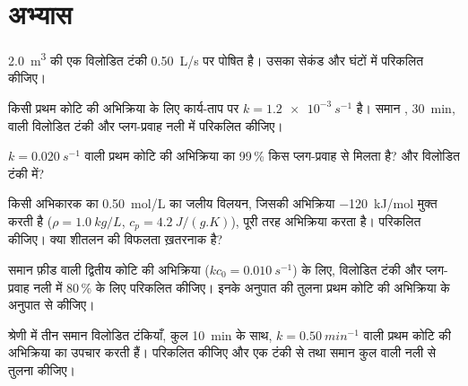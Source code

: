 \section{अभ्यास}

\begin{exercise}[$\star$]\label{exo:b2:continuous-reactors:1}
\qty{2.0}{m^3} की एक विलोडित टंकी \qty{0.50}{L/s} पर पोषित है। उसका
 सेकंड और घंटों में परिकलित कीजिए।
\end{exercise}

\begin{exercise}[$\star$]\label{exo:b2:continuous-reactors:2}
किसी प्रथम कोटि की अभिक्रिया के लिए कार्य-ताप पर $k = \qty{1.2e-3}{s^{-1}}$ है।
समान , \qty{30}{min}, वाली विलोडित टंकी और प्लग-प्रवाह नली में
 परिकलित कीजिए।
\end{exercise}

\begin{exercise}[$\star$]\label{exo:b2:continuous-reactors:3}
$k = \qty{0.020}{s^{-1}}$ वाली प्रथम कोटि की अभिक्रिया का 99\,\% 
किस प्लग-प्रवाह  से मिलता है? और विलोडित टंकी में?
\end{exercise}

\begin{exercise}[$\star$]\label{exo:b2:continuous-reactors:4}
किसी अभिकारक का \qty{0.50}{mol/L} का जलीय विलयन, जिसकी अभिक्रिया
\qty{-120}{kJ/mol} मुक्त करती है ($\rho = \qty{1.0}{kg/L}$, $c_p =
\qty{4.2}{J/(g.K)}$), पूरी तरह अभिक्रिया करता है। 
परिकलित कीजिए। क्या शीतलन की विफलता ख़तरनाक है?
\end{exercise}

\begin{exercise}[$\star\star$]\label{exo:b2:continuous-reactors:5}
समान फ़ीड वाली द्वितीय कोटि की अभिक्रिया ($kc_0 = \qty{0.010}{s^{-1}}$) के लिए,
विलोडित टंकी और प्लग-प्रवाह नली में 80\,\%  के लिए 
परिकलित कीजिए। इनके अनुपात की तुलना प्रथम कोटि की अभिक्रिया के अनुपात से कीजिए।
\end{exercise}

\begin{exercise}[$\star\star$]\label{exo:b2:continuous-reactors:6}
श्रेणी में तीन समान विलोडित टंकियाँ, कुल  \qty{10}{min} के साथ,
$k = \qty{0.50}{min^{-1}}$ वाली प्रथम कोटि की अभिक्रिया का उपचार करती हैं।
 परिकलित कीजिए और एक टंकी से तथा समान कुल  वाली नली से
तुलना कीजिए।
\end{exercise}


